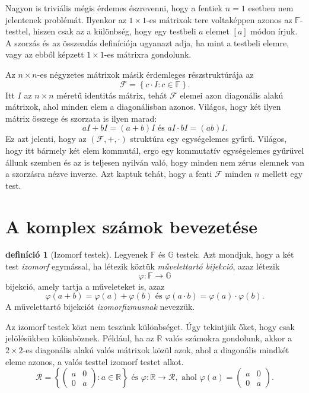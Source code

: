 \documentclass[9pt,showtrims]{memoir}
\theoremstyle{plain}
\theoremstyle{remark}
\theoremstyle{definition}
\newtheorem{definition}[proposition]{definíció}
\renewcommand{\mathbf}{\mathbb}
\begin{document}
Nagyon is triviális mégis érdemes észrevenni, hogy a fentiek $n=1$ esetben nem jelentenek problémát.
Ilyenkor az $1\times 1$-es mátrixok tere voltaképpen azonos az $\mathbf{F}$-testtel, hiszen csak az a különbség,
hogy egy testbeli $a$ elemet $[a]$ módon írjuk. A szorzás és az összeadás definíciója ugyanazt adja,
ha mint a testbeli elemre, vagy az ebből képzett $1\times 1$-es mátrixra gondolunk.

Az $n\times n$-es négyzetes mátrixok másik érdemleges részstruktúrája az
\[
    \mathcal{F}=
    \left\{ c\cdot I:c\in\mathbf{F} \right\}.
\]
Itt $I$ az $n\times n$ méretű identitás mátrix, tehát $\mathcal{F}$ elemei azon diagonális alakú mátrixok, 
ahol minden elem a diagonálisban azonos.
Világos, hogy két ilyen mátrix összege és szorzata is ilyen marad:
\[
    aI+bI=\left( a+b \right)I\text{ és } aI\cdot bI=\left( ab \right)I.
\]
Ez azt jelenti, hogy az $\left( \mathcal{F},+,\cdot \right)$ struktúra egy egységelemes gyűrű.
Világos, hogy itt bármely két elem kommutál, ergo egy kommutatív egységelemes gyűrűvel állunk szemben és
az is teljesen nyilván való, hogy minden nem zérus elemnek van a szorzásra nézve inverze.
Azt kaptuk tehát, hogy a fenti $\mathcal{F}$ minden $n$ mellett egy test.

\section{A komplex számok bevezetése}
\begin{definition}[Izomorf testek]
    Legyenek $\mathbf{F}$ és $\mathbf{G}$ testek.
    Azt mondjuk, hogy a két test \emph{izomorf} egymással, 
    ha létezik köztük \emph{művelettartó bijekció}, azaz létezik
    \[
        \varphi:\mathbf{F}\to\mathbf{G}
    \]
    bijekció, amely tartja a műveleteket is, azaz
    \[
        \varphi\left( a+b \right)=\varphi\left( a \right)+\varphi\left( b \right)
        \text{ és }
        \varphi\left( a\cdot b \right)=\varphi\left( a \right)\cdot \varphi\left( b \right).
    \]
    A művelettartó bijekciót \emph{izomorfizmusnak} nevezzük.
\end{definition}
Az izomorf testek közt nem teszünk különbséget. Úgy tekintjük őket, hogy csak jelölésükben különböznek.
Például, ha az $\mathbf{R}$ valós számokra gondolunk, 
akkor a $2\times 2$-es diagonális alakú valós mátrixok közül azok, ahol a diagonális mindkét eleme azonos,
a valós testtel izomorf testet alkot.
\[
    \mathcal{R}=\left\{ 
        \begin{pmatrix}
            a&0\\
            0&a
        \end{pmatrix}
        :a\in\mathbf{R}
    \right\}
    \text{ és }
    \varphi:\mathbf{R}\to\mathcal{R},
    \text{ ahol } 
    \varphi\left( a \right)
    =
    \begin{pmatrix}
         a&0\\
         0&a
    \end{pmatrix}.
\]
\end{document}
